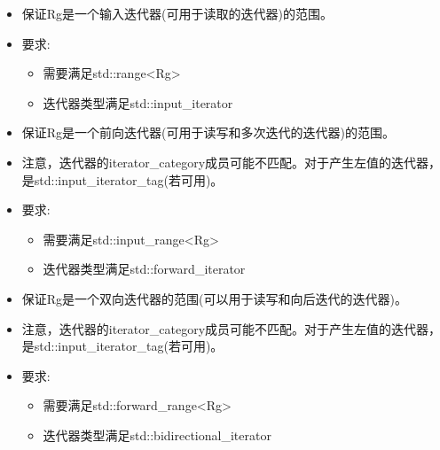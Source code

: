 
\begin{itemize}
\item
保证Rg是一个输入迭代器(可用于读取的迭代器)的范围。

\item
要求:

\begin{itemize}
\item
需要满足std::range<Rg>

\item
迭代器类型满足std::input\_iterator
\end{itemize}
\end{itemize}


\begin{itemize}
\item
保证Rg是一个前向迭代器(可用于读写和多次迭代的迭代器)的范围。

\item
注意，迭代器的iterator\_category成员可能不匹配。对于产生左值的迭代器，是std::input\_iterator\_tag(若可用)。

\item
要求:

\begin{itemize}
\item
需要满足std::input\_range<Rg>

\item
迭代器类型满足std::forward\_iterator
\end{itemize}
\end{itemize}


\begin{itemize}
\item
保证Rg是一个双向迭代器的范围(可以用于读写和向后迭代的迭代器)。

\item
注意，迭代器的iterator\_category成员可能不匹配。对于产生左值的迭代器，是std::input\_iterator\_tag(若可用)。

\item
要求:

\begin{itemize}
\item
需要满足std::forward\_range<Rg>

\item
迭代器类型满足std::bidirectional\_iterator
\end{itemize}
\end{itemize}


